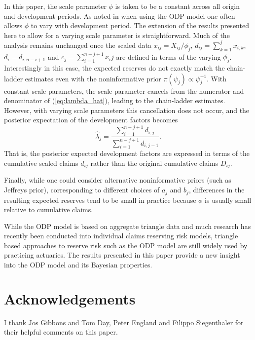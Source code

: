 \documentclass[aps,pre,draft]{revtex4-2}
\begin{document}
In this paper, the scale parameter $\phi$ is taken to be a constant across all origin and development periods. As noted in \cite{england2006predictive} 
when using the ODP model one often allows $\phi$ to vary with development period. 
The extension of the results presented here to allow for a varying scale parameter is straightforward. Much of the analysis remains unchanged once the scaled data $x_{ij}=X_{ij}/\phi_j$, 
$d_{ij}=\sum_{k=1}^j x_{i,k}$, $d_i=d_{i,n-i+1}$ and $c_j=\sum_{i=1}^{n-j+1}{x_ij}$ are defined
in terms of the varying $\phi_j$. Interestingly in this case, the expected reserves do not exactly match the chain-ladder 
estimates even with the noninformative 
prior $\pi(\psi_j)\propto\psi_j^{-1}$. With constant scale parameters, the scale parameter cancels from the numerator and denominator of (\ref{eq:lambda_hat}), leading to the chain-ladder estimates. However, with 
varying scale parameters this cancellation does not occur, and the 
posterior expectation of the development factors becomes
\begin{equation}
\hat{\lambda}_j=\frac{\sum_{i=1}^{n-j+1}d_{i,j}}{\sum_{i=1}^{n-j+1}d_{i,j-1}}.
\end{equation}
That is, the posterior expected development factors are expressed in terms of the cumulative scaled claims $d_{ij}$ rather than the original 
cumulative claims $D_{ij}$.

Finally, while one could consider alternative noninformative priors (such as Jeffreys prior), corresponding to different choices of $a_j$ and $b_j$, 
differences in the resulting expected reserves tend to be small 
in practice because $\phi$ is usually small relative to cumulative claims.

While the ODP model is based on aggregate triangle data and much research has recently been conducted into individual claims
reserving risk models, triangle based approaches to reserve risk such as the ODP model are still widely used by 
practicing actuaries. The results presented in this paper provide a new insight into the ODP model and its Bayesian
properties.


\section*{Acknowledgements}

I thank Jos Gibbons and Tom Day, Peter England and Filippo Siegenthaler for their helpful comments on this paper.
\end{document}
